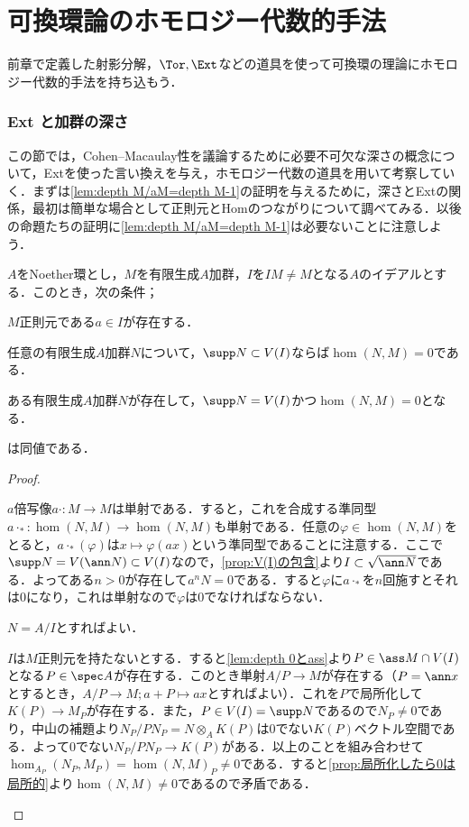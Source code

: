 \part[Homological method to ring theory]{可換環論のホモロジー代数的手法}
前章で定義した射影分解，$\Tor,\Ext$などの道具を使って可換環の理論にホモロジー代数的手法を持ち込もう．

\section{Ext と加群の深さ}
この節では，Cohen--Macaulay性を議論するために必要不可欠な深さの概念について，Extを使った言い換えを与え，ホモロジー代数の道具を用いて考察していく．まずは\ref{lem:depth M/aM=depth M-1}の証明を与えるために，深さとExtの関係，最初は簡単な場合として正則元とHomのつながりについて調べてみる．以後の命題たちの証明に\ref{lem:depth M/aM=depth M-1}は必要ないことに注意しよう．

\begin{lem}
	$A$をNoether環とし，$M$を有限生成$A$加群，$I$を$IM\neq M$となる$A$のイデアルとする．このとき，次の条件；
	\begin{sakura}
		\item $M$正則元である$a\in I$が存在する．
		\item 任意の有限生成$A$加群$N$について，$\supp N\subset V(I)$ならば$\hom(N,M)=0$である．
		\item ある有限生成$A$加群$N$が存在して，$\supp N=V(I)$かつ$\hom(N,M)=0$となる．
	\end{sakura}
	は同値である．
\end{lem}

\begin{proof}
	\begin{eqv}[3]
		\item $a$倍写像$a\cdot:M\to M$は単射である．すると，これを合成する準同型$a\cdot_ \ast:\hom(N,M)\to\hom(N,M)$も単射である．任意の$\varphi\in\hom(N,M)$をとると，$a\cdot_\ast(\varphi)$は$x\mapsto \varphi(ax)$という準同型であることに注意する．ここで$\supp N=V(\ann N)\subset V(I)$なので，\ref{prop:V(I)の包含}より$I\subset \sqrt{\ann N}$である．よってある$n>0$が存在して$a^nN=0$である．すると$\varphi$に$a\cdot_\ast$を$n$回施すとそれは$0$になり，これは単射なので$\varphi$は$0$でなければならない．
		\item $N=A/I$とすればよい．
		\item $I$は$M$正則元を持たないとする．すると\ref{lem:depth 0とass}より$P\in\ass M\cap V(I)$となる$P\in\spec A$が存在する．このとき単射$A/P\to M$が存在する（$P=\ann x$とするとき，$A/P\to M;a+P\mapsto ax$とすればよい）．これを$P$で局所化して$K(P)\to M_P$が存在する．また，$P\in V(I)=\supp N$であるので$N_P\neq 0$であり，中山の補題より$N_P/PN_P=N\otimes_A K(P)$は$0$でない$K(P)$ベクトル空間である．よって$0$でない$N_P/PN_P\to K(P)$がある．以上のことを組み合わせて$\hom_{A_P}(N_P,M_P)=\hom(N,M)_P\neq0$である．すると\ref{prop:局所化したら0は局所的}より$\hom (N,M)\neq0$であるので矛盾である．
	\end{eqv}
\end{proof}

